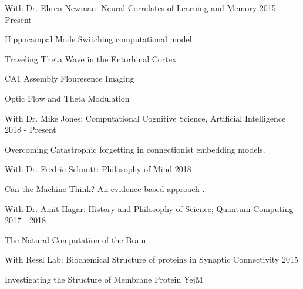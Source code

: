 \begin{cventries}

  
\cvrpentry
    {With Dr. Ehren Newman: Neural Correlates of Learning and Memory} %
    {} %
    {} %
    {2015 - Present } %
    {
      \begin{cvitems} %
        \item {Hippocampal Mode Switching computational model}
	\item{Traveling Theta Wave in the Entorhinal Cortex}
	\item{CA1 Assembly Flouresence Imaging}
	\item{Optic Flow and Theta Modulation}
      \end{cvitems}
    }

\cvrpentry
    {With Dr. Mike Jones: Computational Cognitive Science, Artificial Intelligence} %
    {} %
    {} %
    {2018 - Present} %
    {
      \begin{cvitems} %
        \item {Overcoming Catastrophic forgetting in connectionist embedding models.}
      \end{cvitems}
    }

\cvrpentry
    {With Dr. Fredric Schmitt: Philosophy of Mind} %
    {} %
    {} %
    {2018} %
    {
      \begin{cvitems} %
        \item {Can the Machine Think? An evidence based approach .}
      \end{cvitems}
    }

\cvrpentry
    {With Dr. Amit Hagar: History and Philosophy of Science; Quantum Computing} %
    {} %
    {} %
    {2017 - 2018 } %
    {
      \begin{cvitems} %
        \item {The Natural Computation of the Brain}
      \end{cvitems}
    }

\cvrpentry
    {With Ressl Lab: Biochemical Structure of proteins in Synaptic Connectivity} %
    {} %
    {} %
    {2015} %
    {
      \begin{cvitems} %
        \item {Investigating the Structure of Membrane Protein YejM}
      \end{cvitems}
    }


\end{cventries}
